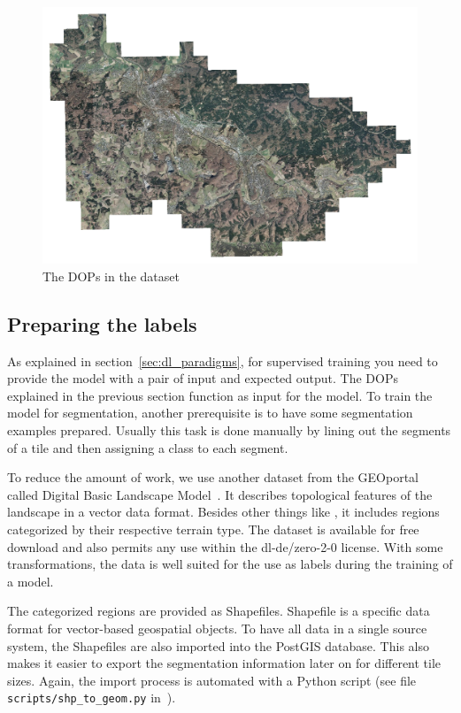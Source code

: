 \begin{figure}[h]
    \centering
    \includegraphics[width=\textwidth]{images/dop_rgb_all}
    \caption{The DOPs in the dataset}
    \label{fig:dop_rgb_all}
\end{figure}

\subsection{Preparing the labels}
\label{sec:prepare_labels}
As explained in section~\ref{sec:dl_paradigms}, for supervised training you need to provide the model with a pair of input and expected output. The DOPs explained in the previous section function as input for the model. To train the model for segmentation, another prerequisite is to have some segmentation examples prepared. Usually this task is done manually by lining out the segments of a tile and then assigning a class to each segment.

To reduce the amount of work, we use another dataset from the GEOportal called Digital Basic Landscape Model~\cite{base-dlm20}. It describes topological features of the landscape in a vector data format. Besides other things like , it includes regions categorized by their respective terrain type. The dataset is available for free download and also permits any use within the dl-de/zero-2-0 license. With some transformations, the data is well suited for the use as labels during the training of a model.

The categorized regions are provided as Shapefiles. Shapefile is a specific data format for vector-based geospatial objects. To have all data in a single source system, the Shapefiles are also imported into the PostGIS database. This also makes it easier to export the segmentation information later on for different tile sizes. Again, the import process is automated with a Python script (see file \texttt{scripts/shp\_to\_geom.py} in~\cite{thesis-code20}).

